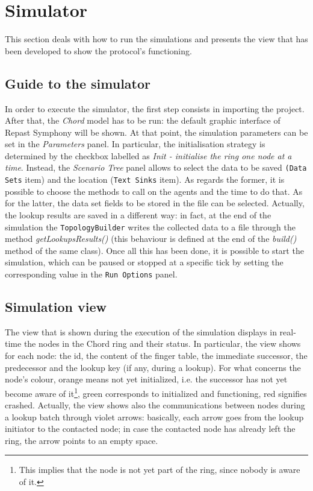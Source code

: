 \documentclass[11pt,twocolumn,letterpaper]{article}
\begin{document}
	\section{Simulator}
	\label{sec:simulator}
	This section deals with how to run the simulations and presents the view that has been developed to show the protocol's functioning.
	
	\subsection{Guide to the simulator}
	\label{subsec:simulator-guide}
	In order to execute the simulator, the first step consists in importing the project. After that, the \textit{Chord} model has to be run: the default graphic interface of Repast Symphony will be shown. At that point, the simulation parameters can be set in the \textit{Parameters} panel. In particular, the initialisation strategy is determined by the checkbox labelled as \textit{Init - initialise the ring one node at a time}.  Instead, the \textit{Scenario Tree} panel allows to select the data to be saved \texttt{(Data Sets} item) and the location (\texttt{Text Sinks} item). As regards the former, it is possible to choose the methods to call on the agents and the time to do that. As for the latter, the data set fields to be stored in the file can be selected. Actually, the lookup results are saved in a different way: in fact, at the end of the simulation the \texttt{TopologyBuilder} writes the collected data to a file through the method \textit{getLookupsResults()} (this behaviour is defined at the end of the \textit{build()} method of the same class). Once all this has been done, it is possible to start the simulation, which can be paused or stopped at a specific tick by setting the corresponding value in the \texttt{Run Options} panel.
	
	\subsection{Simulation view}
	\label{subsec:simulation-view}
	The view that is shown during the execution of the simulation displays in real-time the nodes in the Chord ring and their status. In particular, the view shows for each node: the id, the content of the finger table, the immediate successor, the predecessor and the lookup key (if any, during a lookup). For what concerns the node's colour, orange means not yet initialized, i.e. the successor has not yet become aware of it\footnote{This implies that the node is not yet part of the ring, since nobody is aware of it.}, green corresponds to initialized and functioning, red signifies crashed. Actually, the view shows also the communications between nodes during a lookup batch through violet arrows: basically, each arrow goes from the lookup initiator to the contacted node; in case the contacted node has already left the ring, the arrow points to an empty space.
	
\end{document}
